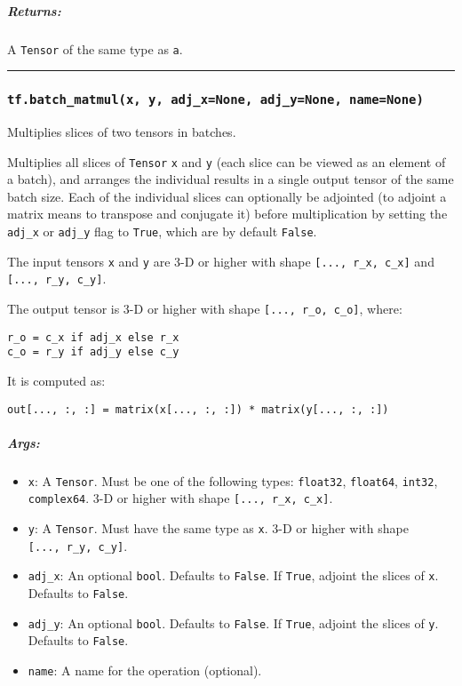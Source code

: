 \subparagraph{Returns: }\label{returns-25}

A \texttt{Tensor} of the same type as \texttt{a}.

\begin{center}\rule{0.5\linewidth}{\linethickness}\end{center}

\subsubsection{\texorpdfstring{\texttt{tf.batch\_matmul(x,\ y,\ adj\_x=None,\ adj\_y=None,\ name=None)}
}{tf.batch\_matmul(x, y, adj\_x=None, adj\_y=None, name=None) }}\label{tf.batchux5fmatmulx-y-adjux5fxnone-adjux5fynone-namenone}

Multiplies slices of two tensors in batches.

Multiplies all slices of \texttt{Tensor} \texttt{x} and \texttt{y} (each
slice can be viewed as an element of a batch), and arranges the
individual results in a single output tensor of the same batch size.
Each of the individual slices can optionally be adjointed (to adjoint a
matrix means to transpose and conjugate it) before multiplication by
setting the \texttt{adj\_x} or \texttt{adj\_y} flag to \texttt{True},
which are by default \texttt{False}.

The input tensors \texttt{x} and \texttt{y} are 3-D or higher with shape
\texttt{{[}...,\ r\_x,\ c\_x{]}} and \texttt{{[}...,\ r\_y,\ c\_y{]}}.

The output tensor is 3-D or higher with shape
\texttt{{[}...,\ r\_o,\ c\_o{]}}, where:

\begin{verbatim}
r_o = c_x if adj_x else r_x
c_o = r_y if adj_y else c_y
\end{verbatim}

It is computed as:

\begin{verbatim}
out[..., :, :] = matrix(x[..., :, :]) * matrix(y[..., :, :])
\end{verbatim}

\subparagraph{Args: }\label{args-26}

\begin{itemize}
\tightlist
\item
  \texttt{x}: A \texttt{Tensor}. Must be one of the following types:
  \texttt{float32}, \texttt{float64}, \texttt{int32},
  \texttt{complex64}. 3-D or higher with shape
  \texttt{{[}...,\ r\_x,\ c\_x{]}}.
\item
  \texttt{y}: A \texttt{Tensor}. Must have the same type as \texttt{x}.
  3-D or higher with shape \texttt{{[}...,\ r\_y,\ c\_y{]}}.
\item
  \texttt{adj\_x}: An optional \texttt{bool}. Defaults to
  \texttt{False}. If \texttt{True}, adjoint the slices of \texttt{x}.
  Defaults to \texttt{False}.
\item
  \texttt{adj\_y}: An optional \texttt{bool}. Defaults to
  \texttt{False}. If \texttt{True}, adjoint the slices of \texttt{y}.
  Defaults to \texttt{False}.
\item
  \texttt{name}: A name for the operation (optional).
\end{itemize}


